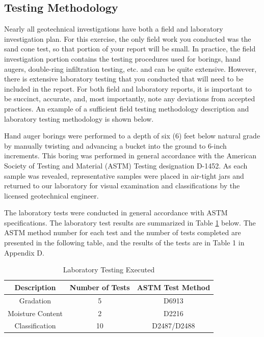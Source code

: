 \documentclass[12pt]{article}
\begin{document}
\pagebreak
\subsection{Testing Methodology}
Nearly all geotechnical investigations have both a field and laboratory investigation plan. For this exercise, the only field work you conducted was the sand cone test, so that portion of your report will be small. In practice, the field investigation portion contains the testing procedures used for borings, hand augers, double-ring infiltration testing, etc. and can be quite extensive. However, there is extensive laboratory testing that you conducted that will need to be included in the report. For both field and laboratory reports, it is important to be succinct, accurate, and, most importantly, note any deviations from accepted practices. An example of a sufficient field testing methodology description and laboratory testing methodology is shown below.

\begin{letter}
Hand auger borings were performed to a depth of six (6) feet below natural grade by manually twisting and advancing a bucket into the ground to 6-inch increments. This boring was performed in general accordance with the American Society of Testing and Material (ASTM) Testing designation D-1452. As each sample was revealed, representative samples were placed in air-tight jars and returned to our laboratory for visual examination and classifications by the licensed geotechnical engineer.

The laboratory tests were conducted in general accordance with ASTM specifications. The laboratory test results are summarized in Table \ref{tab:example_LTP} below. The ASTM method number for each test and the number of tests completed are presented in the following table, and the results of the tests are in Table 1 in Appendix D.

\begin{table}[H]
    \centering
     \caption{Laboratory Testing Executed}
    \label{tab:example_LTP}
    \begin{tabular}{ccc}
\hline
Description & Number of Tests & ASTM Test Method \\ \hline
Gradation & 5 & D6913 \\
Moisture Content & 2 & D2216 \\
Classification & 10 & D2487/D2488 \\ \hline
\end{tabular}
\end{table}
\end{letter}
\end{document}
